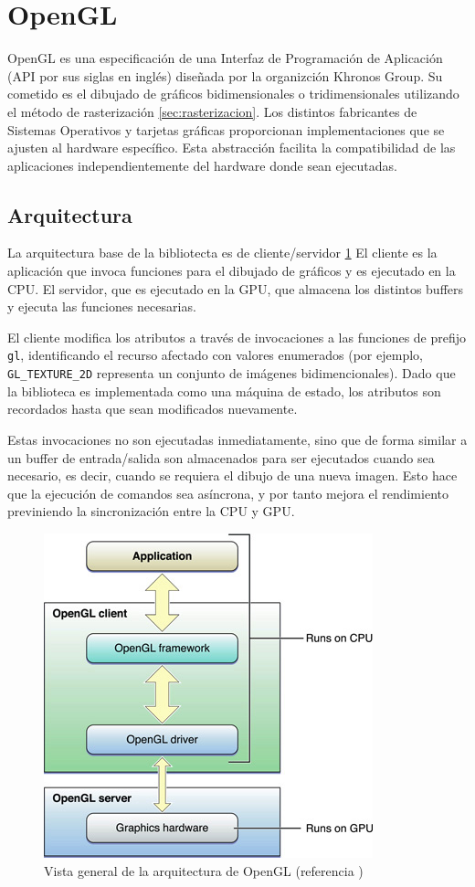 \section{OpenGL}
OpenGL es una especificación de una Interfaz de Programación de Aplicación (API por sus siglas en inglés) diseñada por la organizción Khronos Group. Su cometido es el dibujado de gráficos bidimensionales o tridimensionales utilizando el método de rasterización \ref{sec:rasterizacion}. Los distintos fabricantes de Sistemas Operativos y tarjetas gráficas proporcionan implementaciones que se ajusten al hardware específico. Esta abstracción facilita la compatibilidad de las aplicaciones independientemente del hardware donde sean ejecutadas.

\subsection{Arquitectura}
La arquitectura base de la bibliotecta es de cliente/servidor \ref{img:gpucpugl} El cliente es la aplicación que invoca funciones para el dibujado de gráficos y es ejecutado en la CPU. El servidor, que es ejecutado en la GPU, que almacena los distintos buffers y ejecuta las funciones necesarias.

El cliente modifica los atributos a través de invocaciones a las funciones de prefijo \verb|gl|, identificando el recurso afectado con valores enumerados (por ejemplo, \verb|GL_TEXTURE_2D| representa un conjunto de imágenes bidimencionales). Dado que la biblioteca es implementada como una máquina de estado, los atributos son recordados hasta que sean modificados nuevamente.

Estas invocaciones no son ejecutadas inmediatamente, sino que de forma similar a un buffer de entrada/salida son almacenados para ser ejecutados cuando sea necesario, es decir, cuando se requiera el dibujo de una nueva imagen. Esto hace que la ejecución de comandos sea asíncrona, y por tanto mejora el rendimiento previniendo la sincronización entre la CPU y GPU.

\vspace{5mm}
\begin{figure}[h]
	\centering
	\includegraphics[width=.7\linewidth]{assets/cpu_gpu}
	\caption{Vista general de la arquitectura de OpenGL (referencia \cite{AppleGL})}
	\label{img:gpucpugl}
 \end{figure}

